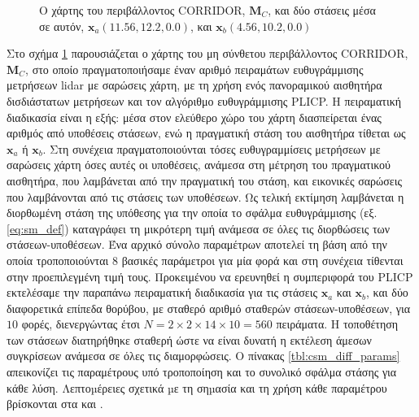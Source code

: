 \begin{figure}\centering
  
  \caption{\small Ο χάρτης του περιβάλλοντος CORRIDOR, $\bm{M}_C$, και δύο
           στάσεις μέσα σε αυτόν, $\bm{x}_a(11.56, 12.2, 0.0)$, και
           $\bm{x}_b(4.56, 10.2, 0.0)$}
  \label{fig:02_02_05:corridor_motivation}
\end{figure}

Στο σχήμα \ref{fig:02_02_05:corridor_motivation} παρουσιάζεται ο χάρτης του μη
σύνθετου περιβάλλοντος CORRIDOR, $\bm{M}_C$, στο οποίο πραγματοποιήσαμε έναν
αριθμό πειραμάτων ευθυγράμμισης μετρήσεων lidar με σαρώσεις χάρτη, με τη χρήση
ενός πανοραμικού αισθητήρα δισδιάστατων μετρήσεων και τον αλγόριθμο
ευθυγράμμισης PLICP. Η πειραματική διαδικασία είναι η εξής: μέσα στον ελεύθερο
χώρο του χάρτη διασπείρεται ένας αριθμός από υποθέσεις στάσεων, ενώ η
πραγματική στάση του αισθητήρα τίθεται ως $\bm{x}_a$ ή $\bm{x}_b$. Στη συνέχεια
πραγματοποιούνται τόσες ευθυγραμμίσεις μετρήσεων με σαρώσεις χάρτη όσες αυτές
οι υποθέσεις, ανάμεσα στη μέτρηση του πραγματικού αισθητήρα, που λαμβάνεται από
την πραγματική του στάση, και εικονικές σαρώσεις που λαμβάνονται από τις
στάσεις των υποθέσεων. Ως τελική εκτίμηση λαμβάνεται η διορθωμένη στάση της
υπόθεσης για την οποία το σφάλμα ευθυγράμμισης (εξ. \ref{eq:sm_def}) καταγράφει
τη μικρότερη τιμή ανάμεσα σε όλες τις διορθώσεις των στάσεων-υποθέσεων. Ένα
αρχικό σύνολο παραμέτρων αποτελεί τη βάση από την οποία τροποποιούνται $8$
βασικές παράμετροι για μία φορά και στη συνέχεια τίθενται στην προεπιλεγμένη
τιμή τους. Προκειμένου να ερευνηθεί η συμπεριφορά του PLICP εκτελέσαμε την
παραπάνω πειραματική διαδικασία για τις στάσεις $\bm{x}_a$ και $\bm{x}_b$, και
δύο διαφορετικά επίπεδα θορύβου, με σταθερό αριθμό σταθερών στάσεων-υποθέσεων,
για $10$ φορές, διενεργώντας έτσι $N = 2 \times 2 \times 14 \times 10 = 560$
πειράματα. Η τοποθέτηση των στάσεων διατηρήθηκε σταθερή ώστε να είναι δυνατή η
εκτέλεση άμεσων συγκρίσεων ανάμεσα σε όλες τις διαμορφώσεις. Ο πίνακας
\ref{tbl:csm_diff_params} απεικονίζει τις παραμέτρους υπό τροποποίηση και το
συνολικό σφάλμα στάσης για κάθε λύση.  Λεπτοµέρειες σχετικά µε τη σηµασία και
τη χρήση κάθε παραμέτρου βρίσκονται στα \cite{csm_manual1} και
\cite{csm_manual2}.



